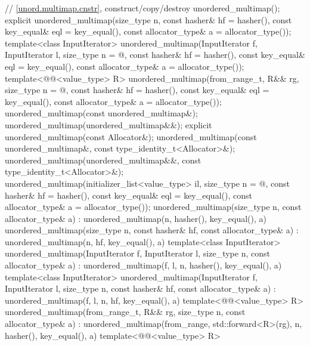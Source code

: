 \begin{codeblock}
{{    // \ref{unord.multimap.cnstr}, construct/copy/destroy
    unordered_multimap();
    explicit unordered_multimap(size_type n,
                                const hasher& hf = hasher(),
                                const key_equal& eql = key_equal(),
                                const allocator_type& a = allocator_type());
    template<class InputIterator>
      unordered_multimap(InputIterator f, InputIterator l,
                         size_type n = @\seebelow@,
                         const hasher& hf = hasher(),
                         const key_equal& eql = key_equal(),
                         const allocator_type& a = allocator_type());
    template<@@<value_type> R>
      unordered_multimap(from_range_t, R&& rg,
                         size_type n = @\seebelow@,
                         const hasher& hf = hasher(),
                         const key_equal& eql = key_equal(),
                         const allocator_type& a = allocator_type());
    unordered_multimap(const unordered_multimap&);
    unordered_multimap(unordered_multimap&&);
    explicit unordered_multimap(const Allocator&);
    unordered_multimap(const unordered_multimap&, const type_identity_t<Allocator>&);
    unordered_multimap(unordered_multimap&&, const type_identity_t<Allocator>&);
    unordered_multimap(initializer_list<value_type> il,
                       size_type n = @\seebelow@,
                       const hasher& hf = hasher(),
                       const key_equal& eql = key_equal(),
                       const allocator_type& a = allocator_type());
    unordered_multimap(size_type n, const allocator_type& a)
      : unordered_multimap(n, hasher(), key_equal(), a) { }
    unordered_multimap(size_type n, const hasher& hf, const allocator_type& a)
      : unordered_multimap(n, hf, key_equal(), a) { }
    template<class InputIterator>
      unordered_multimap(InputIterator f, InputIterator l, size_type n, const allocator_type& a)
        : unordered_multimap(f, l, n, hasher(), key_equal(), a) { }
    template<class InputIterator>
      unordered_multimap(InputIterator f, InputIterator l, size_type n, const hasher& hf,
                         const allocator_type& a)
        : unordered_multimap(f, l, n, hf, key_equal(), a) { }
  template<@@<value_type> R>
    unordered_multimap(from_range_t, R&& rg, size_type n, const allocator_type& a)
      : unordered_multimap(from_range, std::forward<R>(rg),
                           n, hasher(), key_equal(), a) { }
  template<@@<value_type> R>
}}
\end{codeblock}
